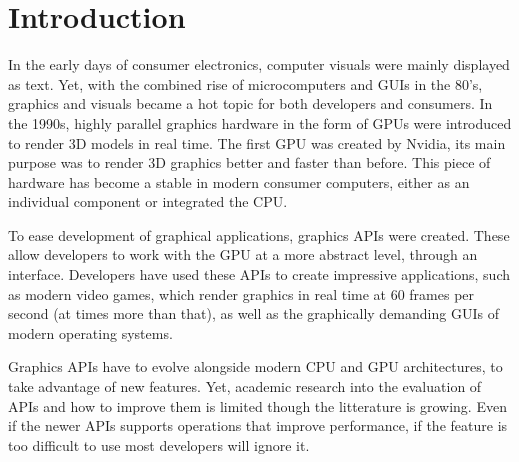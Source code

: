 \chapter{Introduction}\label{ch:introduction} 
In the early days of consumer electronics, computer visuals were mainly displayed as text.
Yet, with the combined rise of microcomputers and \glspl{GUI} in the 80's, graphics and visuals became a hot topic for both developers and consumers. 
In the 1990s, highly parallel graphics hardware in the form of \glspl{GPU} were introduced to render 3D models in real time.
The first \gls{GPU} was created by Nvidia, its main purpose was to render 3D graphics better and faster than before. \cite{NvidiaFirstGPU} 
This piece of hardware has become a stable in modern consumer computers, either as an individual component or integrated the CPU.

To ease development of graphical applications, graphics \glspl{API} were created. 
These allow developers to work with the GPU at a more abstract level, through an interface.
Developers have used these \glspl{API} to create impressive applications, such as modern video games, which render graphics in real time at 60 frames per second (at times more than that), as well as the graphically demanding \glspl{GUI} of modern operating systems.

Graphics \glspl{API} have to evolve alongside modern CPU and GPU architectures, to take advantage of new features. 
Yet, academic research into the evaluation of \glspl{API} and how to improve them is limited though the litterature is growing.
Even if the newer \glspl{API} supports operations that improve performance, if the feature is too difficult to use most developers will ignore it.

